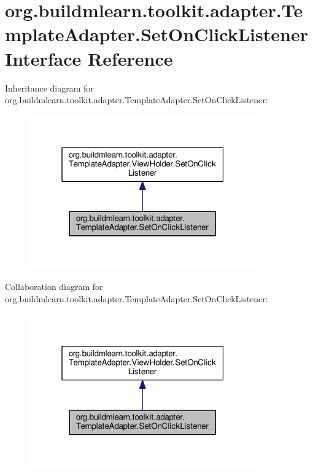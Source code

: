 \hypertarget{interfaceorg_1_1buildmlearn_1_1toolkit_1_1adapter_1_1TemplateAdapter_1_1SetOnClickListener}{}\section{org.\+buildmlearn.\+toolkit.\+adapter.\+Template\+Adapter.\+Set\+On\+Click\+Listener Interface Reference}
\label{interfaceorg_1_1buildmlearn_1_1toolkit_1_1adapter_1_1TemplateAdapter_1_1SetOnClickListener}


Inheritance diagram for org.\+buildmlearn.\+toolkit.\+adapter.\+Template\+Adapter.\+Set\+On\+Click\+Listener\+:
\nopagebreak
\begin{figure}[H]
\begin{center}
\leavevmode
\includegraphics[width=277pt]{interfaceorg_1_1buildmlearn_1_1toolkit_1_1adapter_1_1TemplateAdapter_1_1SetOnClickListener__inherit__graph}
\end{center}
\end{figure}


Collaboration diagram for org.\+buildmlearn.\+toolkit.\+adapter.\+Template\+Adapter.\+Set\+On\+Click\+Listener\+:
\nopagebreak
\begin{figure}[H]
\begin{center}
\leavevmode
\includegraphics[width=277pt]{interfaceorg_1_1buildmlearn_1_1toolkit_1_1adapter_1_1TemplateAdapter_1_1SetOnClickListener__coll__graph}
\end{center}
\end{figure}
